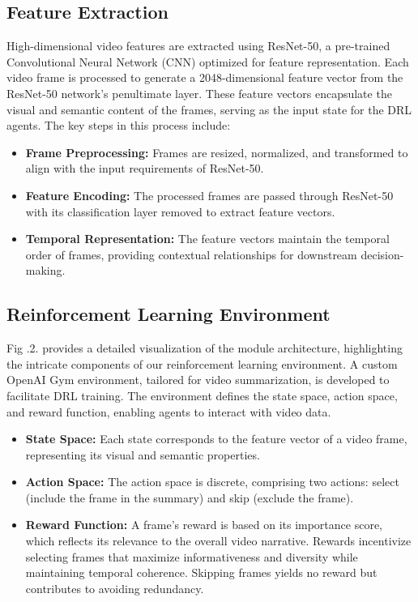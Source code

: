 \documentclass[conference]{IEEEtran}
\begin{document}
\subsection{\textbf{Feature Extraction}}
High-dimensional video features are extracted using ResNet-50, a pre-trained Convolutional Neural Network (CNN) optimized for feature representation. Each video frame is processed to generate a 2048-dimensional feature vector from the ResNet-50 network's penultimate layer. These feature vectors encapsulate the visual and semantic content of the frames, serving as the input state for the DRL agents. The key steps in this process include:
\begin{itemize}
\item \textbf{Frame Preprocessing:} Frames are resized, normalized, and transformed to align with the input requirements of ResNet-50.
\item \textbf{Feature Encoding:} The processed frames are passed through ResNet-50 with its classification layer removed to extract feature vectors.
\item \textbf{Temporal Representation:} The feature vectors maintain the temporal order of frames, providing contextual relationships for downstream decision-making.
\end{itemize}

\subsection{\textbf{Reinforcement Learning Environment}}
Fig .2. provides a detailed visualization of the module architecture, highlighting the intricate components of our reinforcement learning environment. A custom OpenAI Gym environment, tailored for video summarization, is developed to facilitate DRL training. The environment defines the state space, action space, and reward function, enabling agents to interact with video data.
\begin{itemize}
\item \textbf{State Space:} Each state corresponds to the feature vector of a video frame, representing its visual and semantic properties.
\item \textbf{Action Space:} The action space is discrete, comprising two actions: select (include the frame in the summary) and skip (exclude the frame).
\item \textbf{Reward Function:} A frame’s reward is based on its importance score, which reflects its relevance to the overall video narrative. Rewards incentivize selecting frames that maximize informativeness and diversity while maintaining temporal coherence. Skipping frames yields no reward but contributes to avoiding redundancy.
\end{itemize}
\end{document}
